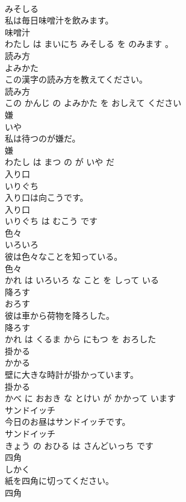 \documentclass[8pt]{extreport}
\begin{document}
\begin{CJK}{UTF8}{min}
\\	みそしる			
\\	私は毎日味噌汁を飲みます。	
\\	味噌汁 
\\	わたし は まいにち みそしる を のみます 。			
\\	読み方	
\\	よみかた			
\\	この漢字の読み方を教えてください。	
\\	読み方 
\\	この かんじ の よみかた を おしえて ください			
\\	嫌	
\\	いや			
\\	私は待つのが嫌だ。	
\\	嫌 
\\	わたし は まつ の が いや だ			
\\	入り口	
\\	いりぐち			
\\	入り口は向こうです。	
\\	入り口 
\\	いりぐち は むこう です			
\\	色々	
\\	いろいろ			
\\	彼は色々なことを知っている。	
\\	色々 
\\	かれ は いろいろ な こと を しって いる			
\\	降ろす	
\\	おろす			
\\	彼は車から荷物を降ろした。	
\\	降ろす 
\\	かれ は くるま から にもつ を おろした			
\\	掛かる	
\\	かかる			
\\	壁に大きな時計が掛かっています。	
\\	掛かる 
\\	かべ に おおき な とけい が かかって います			
\\	サンドイッチ	
\\	今日のお昼はサンドイッチです。	
\\	サンドイッチ 
\\	きょう の おひる は さんどいっち です			
\\	四角	
\\	しかく			
\\	紙を四角に切ってください。	
\\	四角 

\end{CJK}
\end{document}
